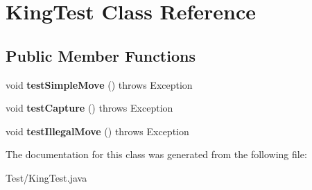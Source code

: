 \hypertarget{class_king_test}{}\section{King\+Test Class Reference}
\label{class_king_test}
\subsection*{Public Member Functions}
\begin{DoxyCompactItemize}
\item 
\hypertarget{class_king_test_a027b1ece1e12a4bbc44b7ecc3bf19a45}{}void {\bfseries test\+Simple\+Move} ()  throws Exception \label{class_king_test_a027b1ece1e12a4bbc44b7ecc3bf19a45}

\item 
\hypertarget{class_king_test_af93043b862ff76688ca8977aea5c8448}{}void {\bfseries test\+Capture} ()  throws Exception \label{class_king_test_af93043b862ff76688ca8977aea5c8448}

\item 
\hypertarget{class_king_test_adfdf4d1888d505c1281ce1020bf5154f}{}void {\bfseries test\+Illegal\+Move} ()  throws Exception \label{class_king_test_adfdf4d1888d505c1281ce1020bf5154f}

\end{DoxyCompactItemize}


The documentation for this class was generated from the following file\+:\begin{DoxyCompactItemize}
\item 
Test/King\+Test.\+java\end{DoxyCompactItemize}
